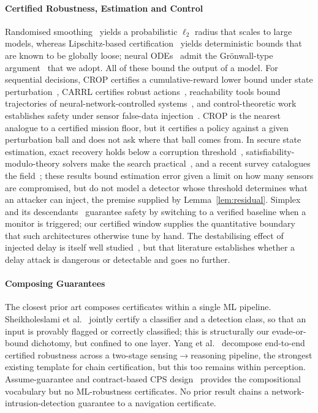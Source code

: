 \paragraph{Certified Robustness, Estimation and Control}
Randomised smoothing~\cite{cohen2019smoothing,salman2019provably} yields a
probabilistic $\ell_2$ radius that scales to large models, whereas
Lipschitz-based certification~\cite{pauli2022training,zhang2022rethinking}
yields deterministic bounds that are known to be globally loose; neural
ODEs~\cite{chen2018neuralode} admit the Gr\"onwall-type
argument~\cite{yan2020robustnode} that we adopt. All of these bound the output
of a model. For sequential decisions, CROP certifies a cumulative-reward lower
bound under state perturbation~\cite{wu2022crop}, CARRL certifies robust
actions~\cite{everett2021carrl}, reachability tools bound trajectories of
neural-network-controlled systems~\cite{ivanov2019verisig,tran2020nnv}, and
control-theoretic work establishes safety under sensor false-data
injection~\cite{li2022lqg}. CROP is the nearest analogue to a certified mission
floor, but it certifies a policy against a given perturbation ball and does not
ask where that ball comes from. In secure state estimation, exact recovery
holds below a corruption threshold~\cite{fawzi2014secure},
satisfiability-modulo-theory solvers make the search
practical~\cite{shoukry2017smt}, and a recent survey catalogues the
field~\cite{ding2021survey}; these results bound estimation error given a limit
on how many sensors are compromised, but do not model a detector whose
threshold determines what an attacker can inject, the premise supplied by
Lemma~\ref{lem:residual}. Simplex and its
descendants~\cite{sha2001simplex,mehmood2022blackbox,cofer2020rta} guarantee
safety by switching to a verified baseline when a monitor is triggered; our
certified window supplies the quantitative boundary that such architectures
otherwise tune by hand. The destabilising effect of injected delay is itself
well studied~\cite{lou2019timedelay,etd2023uav,datamut2026}, but that
literature establishes whether a delay attack is dangerous or detectable and
goes no further.

\paragraph{Composing Guarantees}
The closest prior art composes certificates within a single ML pipeline.
Sheikholeslami et al.~\cite{sheikholeslami2021provably} jointly certify a
classifier and a detection class, so that an input is provably flagged or
correctly classified; this is structurally our evade-or-bound dichotomy, but
confined to one layer. Yang et al.~\cite{yang2022sensing} decompose end-to-end
certified robustness across a two-stage sensing$\to$reasoning pipeline, the
strongest existing template for chain certification, but this too remains
within perception. Assume-guarantee and contract-based CPS
design~\cite{pacti2024} provides the compositional vocabulary but no
ML-robustness certificates. No prior result chains a
network-intrusion-detection guarantee to a navigation certificate.

